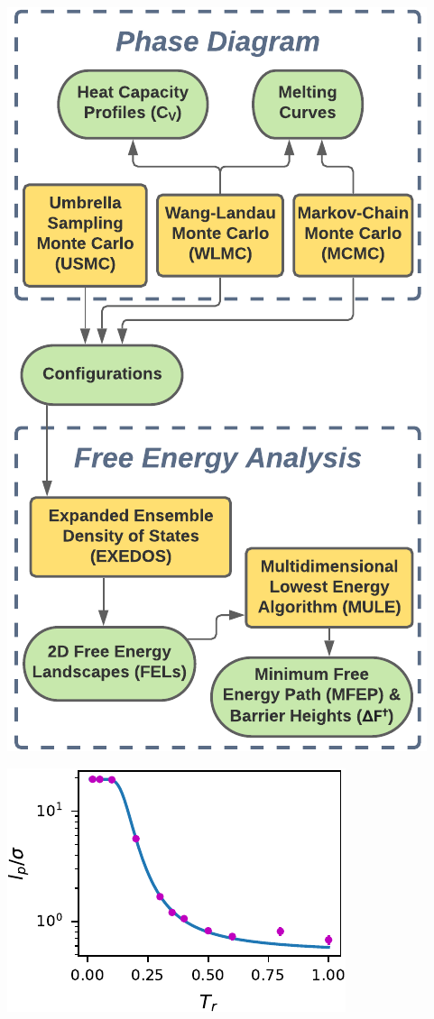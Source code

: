 \documentclass[aspectratio=169]{beamer}
\begin{document}
\begin{frame}[c]{}

  \centering
  \includegraphics[height=\textheight]{../figures/ch4_jcp_from_diss/fig-MCFEL_toolkit_connections/fig-MCFEL_toolkit_connections_V3.pdf}

\end{frame}

\begin{frame}[c]{}

  \centering
  \includegraphics[height=\textheight]{../figures/ch4_jcp_from_diss/fig-lp_vs_T/fig-lp_vs_T.pdf}

\end{frame}
\end{document}
